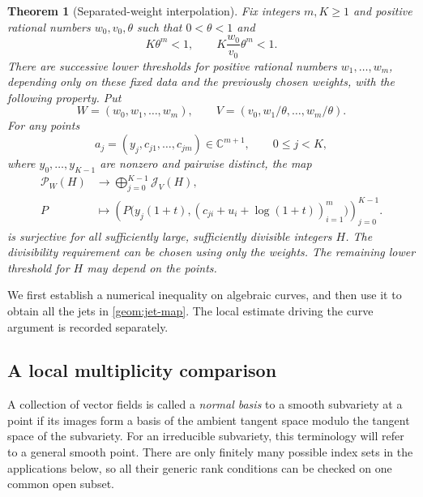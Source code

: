 \documentclass[11pt]{article}
\newcommand{\CC}{\mathbb C}
\newtheorem{theorem}{Theorem}[section]
\theoremstyle{definition}
\theoremstyle{remark}
\numberwithin{equation}{section}
\begin{document}
\begin{theorem}[Separated-weight interpolation]
\label{geom:interpolation}
Fix integers $m,K\ge1$ and positive rational numbers $w_0,v_0,\theta$ such
that $0<\theta<1$ and
\begin{equation}
\label{geom:volume-hypotheses}
 K\theta^m<1,
 \qquad K\frac{w_0}{v_0}\theta^m<1.
\end{equation}
There are successive lower thresholds for positive rational numbers
$w_1,\ldots,w_m$, depending only on these fixed data and the previously
chosen weights, with the following property. Put
\[
 W=(w_0,w_1,\ldots,w_m),\qquad
 V=(v_0,w_1/\theta,\ldots,w_m/\theta).
\]
For any points
\[
 a_j=(y_j,c_{j1},\ldots,c_{jm})\in\CC^{m+1},\qquad 0\le j<K,
\]
where $y_0,\ldots,y_{K-1}$ are nonzero and pairwise distinct, the map
\begin{equation}
\label{geom:jet-map}
 \begin{aligned}
 \mathcal P_W(H)&\longrightarrow\bigoplus_{j=0}^{K-1}\mathcal J_V(H),\\
 P&\longmapsto
 \left(P\bigl(y_j(1+t),(c_{ji}+u_i+\log(1+t))_{i=1}^m\bigr)\right)_{j=0}^{K-1}.
 \end{aligned}
\end{equation}
is surjective for all sufficiently large, sufficiently divisible integers $H$.
The divisibility requirement can be chosen using only the weights. The
remaining lower threshold for $H$ may depend on the points.
\end{theorem}

We first establish a numerical inequality on algebraic curves, and then use
it to obtain all the jets in \eqref{geom:jet-map}. The local estimate driving
the curve argument is recorded separately.

\subsection{A local multiplicity comparison}

A collection of vector fields is called a \emph{normal basis} to a smooth
subvariety at a point if its images form a basis of the ambient tangent space
modulo the tangent space of the subvariety. For an irreducible subvariety,
this terminology will refer to a general smooth point. There are only
finitely many possible index sets in the applications below, so all their
generic rank conditions can be checked on one common open subset.
\end{document}
